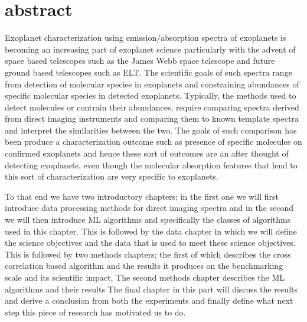 \chapter*{abstract}
Exoplanet characterization using emission/absorption spectra of exoplanets is becoming an increasing part of exoplanet science particularly\@ 
with the advent of space based telescopes such as the James Webb space telescope and future ground based telescopes such as ELT.\@
The scientific goals of such spectra range from detection of molecular species in  exoplanets and constraining abundances of specific\@
molecular species in detected exoplanets.
Typically, the methods used to detect molecules or contrain their abundances, require comparing spectra derived from direct imaging instruments and \@ 
comparing them to known template spectra and interpret the similarities between the two.
The goals of such comparison has been produce a characterization outcome such as presence of specific molecules on confirmed exoplanets and hence\@
these sort of outcomes are an after thought of detecting exoplanets, even though the molecular absorption features that lend to this sort of characterization \@
are very specific to exoplanets.

To that end we have two introductory chapters;
in the first one  we will first introduce data processing methods for direct imaging spectra and in the second we will then introduce ML algorithms and specifically the classes of algorithms used in this chapter.
This is followed by the data chapter in which we will define the science objectives and the data that is used to meet these science objectives.
This is followed by two methods chapters; 
the first of which describes the cross correlation based algorithm and the results it produces on the benchmarking scale and its scientific impact,
The second methods chapter describes the ML algorithms and their results
The final chapter in this part will discuss the results and derive a conclusion from both the experiments and finally define what next step this piece of research has motivated us to do.
